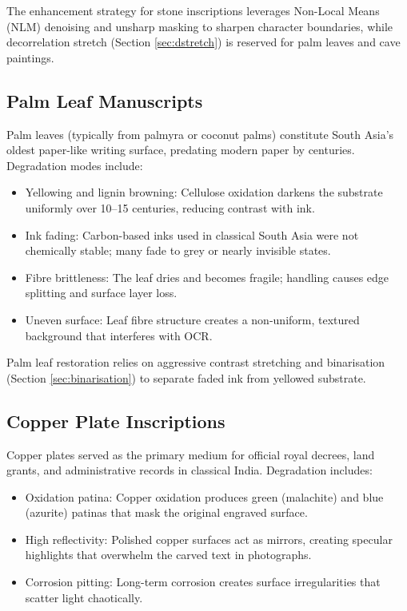 The enhancement strategy for stone inscriptions leverages Non-Local Means (NLM) denoising and unsharp masking to sharpen character boundaries, while decorrelation stretch (Section \ref{sec:dstretch}) is reserved for palm leaves and cave paintings.

\subsection{Palm Leaf Manuscripts}

Palm leaves (typically from palmyra or coconut palms) constitute South Asia's oldest paper-like writing surface, predating modern paper by centuries. Degradation modes include:

\begin{itemize}
	\item Yellowing and lignin browning: Cellulose oxidation darkens the substrate uniformly over 10–15 centuries, reducing contrast with ink.
	\item Ink fading: Carbon-based inks used in classical South Asia were not chemically stable; many fade to grey or nearly invisible states.
	\item Fibre brittleness: The leaf dries and becomes fragile; handling causes edge splitting and surface layer loss.
	\item Uneven surface: Leaf fibre structure creates a non-uniform, textured background that interferes with OCR.
\end{itemize}

Palm leaf restoration relies on aggressive contrast stretching and binarisation (Section \ref{sec:binarisation}) to separate faded ink from yellowed substrate.

\subsection{Copper Plate Inscriptions}

Copper plates served as the primary medium for official royal decrees, land grants, and administrative records in classical India. Degradation includes:

\begin{itemize}
	\item Oxidation patina: Copper oxidation produces green (malachite) and blue (azurite) patinas that mask the original engraved surface.
	\item High reflectivity: Polished copper surfaces act as mirrors, creating specular highlights that overwhelm the carved text in photographs.
	\item Corrosion pitting: Long-term corrosion creates surface irregularities that scatter light chaotically.
\end{itemize}

